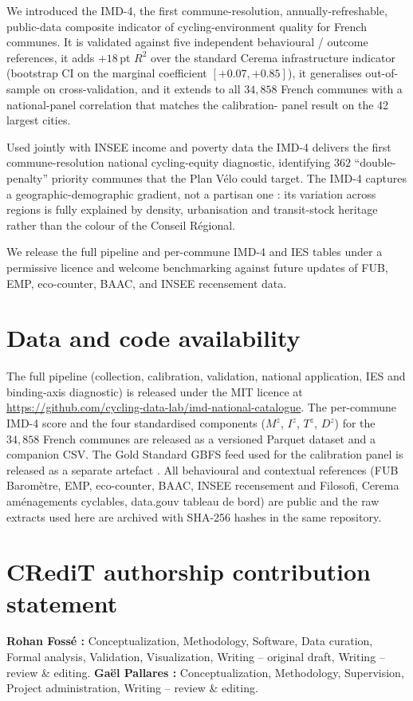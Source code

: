 \documentclass[11pt,a4paper]{article}
\begin{document}
We introduced the IMD-4, the first commune-resolution,
annually-refreshable, public-data composite indicator of
cycling-environment quality for French communes.  It is validated
against five independent behavioural / outcome references, it
adds $+18\,$pt $R^2$ over the standard Cerema infrastructure
indicator (bootstrap CI on the marginal coefficient
$[+0.07, +0.85]$), it generalises out-of-sample on
cross-validation, and it extends to all $34{,}858$ French communes
with a national-panel correlation that matches the calibration-
panel result on the 42 largest cities.

Used jointly with INSEE income and poverty data the IMD-4
delivers the first commune-resolution national cycling-equity
diagnostic, identifying $362$ ``double-penalty'' priority communes
that the Plan V\'elo could target.  The IMD-4 captures a
geographic-demographic gradient, not a partisan one : its variation
across regions is fully explained by density, urbanisation and
transit-stock heritage rather than the colour of the Conseil
R\'egional.

We release the full pipeline and per-commune IMD-4 and IES
tables under a permissive licence and welcome benchmarking against
future updates of FUB, EMP, eco-counter, BAAC, and INSEE recensement
data.

\section*{Data and code availability}

The full pipeline (collection, calibration, validation, national
application, IES and binding-axis diagnostic) is released under
the MIT licence at
\url{https://github.com/cycling-data-lab/imd-national-catalogue}.  The
per-commune IMD-4 score and the four standardised components
($M^z$, $I^z$, $T^z$, $D^z$) for the $34{,}858$ French communes
are released as a versioned Parquet dataset and a companion CSV.
The Gold Standard GBFS feed used for the calibration panel is
released as a separate artefact \citep{Fosse2026gold}.  All
behavioural and contextual references (FUB Barom\`etre, EMP,
eco-counter, BAAC, INSEE recensement and Filosofi, Cerema
am\'enagements cyclables, data.gouv tableau de bord) are public
and the raw extracts used here are archived with SHA-256 hashes
in the same repository.

\section*{CRediT authorship contribution statement}
\textbf{Rohan Foss\'e :} Conceptualization, Methodology,
Software, Data curation, Formal analysis, Validation,
Visualization, Writing -- original draft, Writing -- review \&
editing.
\textbf{Ga\"el Pallares :} Conceptualization, Methodology,
Supervision, Project administration, Writing -- review \&
editing.
\end{document}
